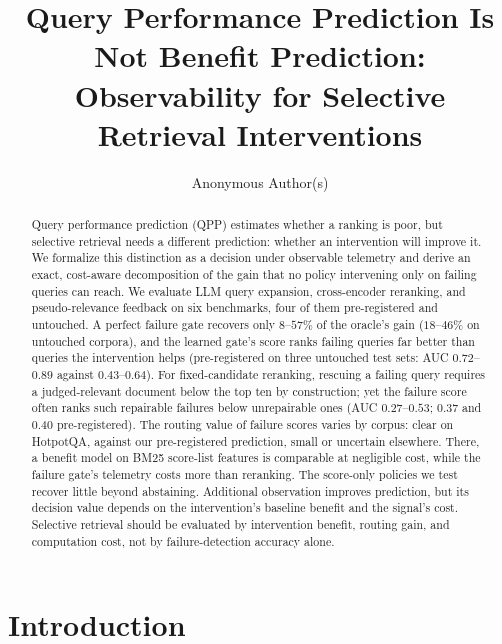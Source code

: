 \documentclass[sigconf,anonymous,review]{acmart}
\begin{document}
\title{Query Performance Prediction Is Not Benefit Prediction: Observability for Selective Retrieval Interventions}

\author{Anonymous Author(s)}

\begin{abstract}
Query performance prediction (QPP) estimates whether a ranking is
poor, but selective retrieval needs a different prediction: whether an
intervention will improve it. We formalize this distinction as a
decision under observable telemetry and derive an exact, cost-aware
decomposition of the gain that no policy intervening only on failing
queries can reach. We evaluate LLM query expansion, cross-encoder
reranking, and pseudo-relevance feedback on six benchmarks, four of
them pre-registered and untouched. A perfect failure gate recovers
only $8$--$57\%$ of the oracle's gain ($18$--$46\%$ on untouched
corpora), and the learned gate's score
ranks failing queries far better than queries the intervention helps (pre-registered on three
untouched test sets: AUC $0.72$--$0.89$ against $0.43$--$0.64$). For
fixed-candidate reranking, rescuing a failing query requires a
judged-relevant document below the top ten by construction; yet the
failure score often ranks such repairable failures below unrepairable
ones (AUC $0.27$--$0.53$; $0.37$ and $0.40$ pre-registered). The
routing value of failure scores varies by corpus: clear on HotpotQA,
against our pre-registered prediction, small or uncertain elsewhere.
There, a benefit model on BM25 score-list features is comparable at
negligible cost, while the failure gate's telemetry costs more than
reranking. The score-only policies we test recover little beyond
abstaining.
Additional observation improves prediction, but its decision value
depends on the intervention's baseline benefit and the signal's cost.
Selective retrieval should be evaluated by intervention benefit,
routing gain, and computation cost, not by failure-detection accuracy
alone.
\end{abstract}

\maketitle

\section{Introduction}
\end{document}
